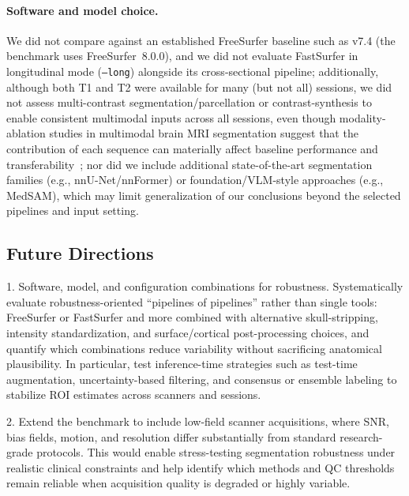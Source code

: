 \documentclass{midl} %
\begin{document}
\paragraph{Software and model choice.} We did not compare against an established FreeSurfer baseline such as v7.4 (the benchmark uses FreeSurfer~8.0.0), and we did not evaluate FastSurfer in longitudinal mode (\texttt{--long}) alongside its cross-sectional pipeline; additionally, although both T1 and T2 were available for many (but not all) sessions, we did not assess multi-contrast segmentation/parcellation or contrast-synthesis to enable consistent multimodal inputs across all sessions, even though modality-ablation studies in multimodal brain MRI segmentation suggest that the contribution of each sequence can materially affect baseline performance and transferability~\citep{Druzhinina2022BRATS2021}; nor did we include additional state-of-the-art segmentation families (e.g., nnU-Net/nnFormer) or foundation/VLM-style approaches (e.g., MedSAM), which may limit generalization of our conclusions beyond the selected pipelines and input setting.



\subsection{Future Directions}
1. Software, model, and configuration combinations for robustness. Systematically evaluate robustness-oriented ``pipelines of pipelines'' rather than single tools: FreeSurfer or FastSurfer and more combined with alternative skull-stripping, intensity standardization, and surface/cortical post-processing choices, and quantify which combinations reduce variability without sacrificing anatomical plausibility. In particular, test inference-time strategies such as test-time augmentation, uncertainty-based filtering, and consensus or ensemble labeling to stabilize ROI estimates across scanners and sessions.

2. Extend the benchmark to include low-field scanner acquisitions, where SNR, bias fields, motion, and resolution differ substantially from standard research-grade protocols. This would enable stress-testing segmentation robustness under realistic clinical constraints and help identify which methods and QC thresholds remain reliable when acquisition quality is degraded or highly variable.
\end{document}
